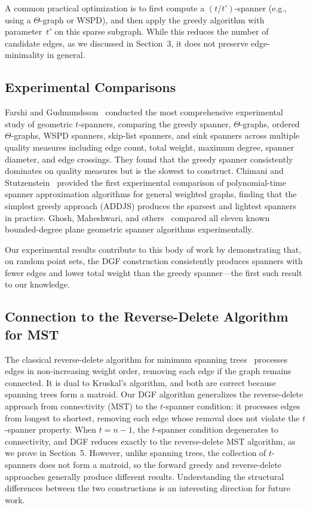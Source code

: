 \documentclass{article}
\begin{document}
A common practical optimization is to first compute a $(t/t')$-spanner (e.g., using a $\Theta$-graph or WSPD), and then apply the greedy algorithm with parameter~$t'$ on this sparse subgraph. While this reduces the number of candidate edges, as we discussed in Section~3, it does not preserve edge-minimality in general.

\subsection{Experimental Comparisons}

Farshi and Gudmundsson~\cite{farshi2009experimental} conducted the most comprehensive experimental study of geometric $t$-spanners, comparing the greedy spanner, $\Theta$-graphs, ordered $\Theta$-graphs, WSPD spanners, skip-list spanners, and sink spanners across multiple quality measures including edge count, total weight, maximum degree, spanner diameter, and edge crossings. They found that the greedy spanner consistently dominates on quality measures but is the slowest to construct. Chimani and Stutzenstein~\cite{chimani2022spanner} provided the first experimental comparison of polynomial-time spanner approximation algorithms for general weighted graphs, finding that the simplest greedy approach (ADDJS) produces the sparsest and lightest spanners in practice. Ghosh, Maheshwari, and others~\cite{ghosh2023bounded} compared all eleven known bounded-degree plane geometric spanner algorithms experimentally.

Our experimental results contribute to this body of work by demonstrating that, on random point sets, the DGF construction consistently produces spanners with fewer edges and lower total weight than the greedy spanner---the first such result to our knowledge.

\subsection{Connection to the Reverse-Delete Algorithm for MST}

The classical reverse-delete algorithm for minimum spanning trees~\cite{kruskal1956shortest} processes edges in non-increasing weight order, removing each edge if the graph remains connected. It is dual to Kruskal's algorithm, and both are correct because spanning trees form a matroid. Our DGF algorithm generalizes the reverse-delete approach from connectivity (MST) to the $t$-spanner condition: it processes edges from longest to shortest, removing each edge whose removal does not violate the $t$-spanner property. When $t = n - 1$, the $t$-spanner condition degenerates to connectivity, and DGF reduces exactly to the reverse-delete MST algorithm, as we prove in Section~5. However, unlike spanning trees, the collection of $t$-spanners does not form a matroid, so the forward greedy and reverse-delete approaches generally produce different results. Understanding the structural differences between the two constructions is an interesting direction for future work.
\end{document}
